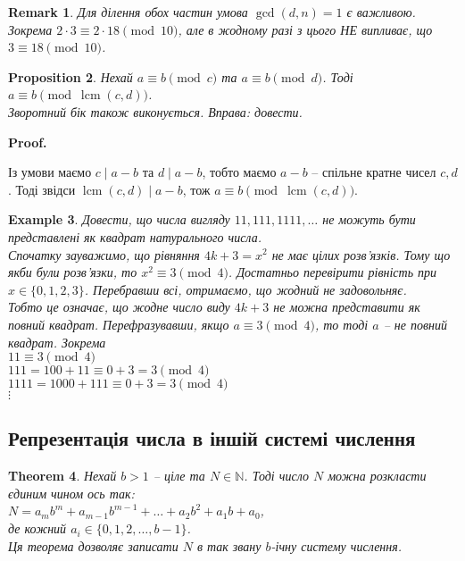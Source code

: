 \documentclass[a4paper, 14pt]{extarticle}
\makeatletter
\theoremstyle{theoremdd}
\newtheorem{theorem}{Theorem}[subsection]
\theoremstyle{theoremdd}
\theoremstyle{theoremdd}
\theoremstyle{theoremdd}
\newtheorem{example}[theorem]{Example}
\theoremstyle{theoremdd}
\newtheorem{proposition}[theorem]{Proposition}
\theoremstyle{theoremdd}
\newtheorem{remark}[theorem]{Remark}
\theoremstyle{theoremdd}
\theoremstyle{theoremdd}
\def\qed{$\blacksquare$}
\renewenvironment{proof}[1][Proof.\\]{\par
\pushQED{\hfill \qed}%
\normalfont \topsep6\p@\@plus6\p@\relax
\trivlist
\item\relax
{\bfseries
#1\@addpunct{.}}\hspace\labelsep\ignorespaces
}{%
\popQED\endtrivlist\@endpefalse
}
\DeclareMathOperator{\lcm}{lcm}
\makeatother
\begin{document}
\begin{remark}
Для ділення обох частин умова $\gcd(d,n) = 1$ є важливою. Зокрема $2 \cdot 3 \equiv 2 \cdot 18 \pmod {10}$, але в жодному разі з цього НЕ випливає, що $3 \equiv 18 \pmod {10}$.
\end{remark}

\begin{proposition}
Нехай $a \equiv b \pmod c$ та $a \equiv b \pmod d$. Тоді \\
$a \equiv b \pmod {\lcm(c,d)}$.\\
\textit{Зворотний бік також виконується. Вправа: довести.}
\end{proposition}

\begin{proof}
Із умови маємо $c \mid a-b$ та $d \mid a-b$, тобто маємо $a-b$ -- спільне кратне чисел $c,d$. Тоді звідси $\lcm(c,d) \mid a-b$, тож $a \equiv b \pmod {\lcm(c,d)}$.
\end{proof}

\begin{example}
Довести, що числа вигляду $11, 111, 1111, \dots$ не можуть бути представлені як квадрат натурального числа.\\
Спочатку зауважимо, що рівняння $4k+3 = x^2$ не має цілих розв'язків. Тому що якби були розв'язки, то $x^2 \equiv 3 \pmod 4$. Достатньо перевірити рівність при $x \in \{0,1,2,3\}$. Перебравши всі, отримаємо, що жодний не задовольняє.\\
Тобто це означає, що жодне число виду $4k+3$ не можна представити як повний квадрат. Перефразувавши, якщо $a \equiv 3 \pmod 4$, то тоді $a$ -- не повний квадрат. Зокрема\\
$11 \equiv 3 \pmod 4$\\
$111 = 100 + 11 \equiv 0 + 3 = 3 \pmod 4$\\
$1111 = 1000 + 111 \equiv 0 + 3 = 3 \pmod 4$\\
$\vdots$
\end{example}

\subsection{Репрезентація числа в іншій системі числення}
\begin{theorem}
Нехай $b > 1$ -- ціле та $N \in \mathbb{N}$. Тоді число $N$ можна розкласти єдиним чином ось так:\\
$N = a_m b^m + a_{m-1} b^{m-1} + \dots + a_2 b^2 + a_1 b + a_0$,\\
де кожний $a_i \in \{0,1,2,\dots,b-1\}$.\\
Ця теорема дозволяє записати $N$ в так звану $b$-ічну систему числення.
\end{theorem}
\end{document}
